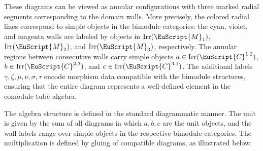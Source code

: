 \documentclass[a4paper,11pt]{article}
\theoremstyle{definition}
\theoremstyle{remark}
\newcommand\eC           {\EuScript{C}}
\newcommand\eM          {\EuScript{M}}
\newcommand{\Irr}{\operatorname{Irr}}
\begin{document}
These diagrams can be viewed as annular configurations with three marked radial segments corresponding to the domain walls. 
More precisely, the colored radial lines correspond to simple objects in the bimodule categories:
the cyan, violet, and magenta walls are labeled by objects in 
$\Irr(\eM_1)$, $\Irr(\eM_2)$, and $\Irr(\eM_3)$, respectively. 
The annular regions between consecutive walls carry simple objects 
$a\in \Irr(\eC^{1,2})$, $b\in \Irr(\eC^{2,3})$, and $c\in \Irr(\eC^{3,1})$.
The additional labels $\gamma,\zeta,\mu,\nu,\sigma,\tau$ 
encode morphism data compatible with the bimodule structures, ensuring that the entire diagram represents a well-defined element in the comodule tube algebra.


The algebra structure is defined in the standard diagrammatic manner.
The unit is given by the sum of all diagrams in which $a,b,c$ are the unit objects, and the wall labels range over simple objects in the respective bimodule categories. 
The multiplication is defined by gluing of compatible diagrams, as illustrated below:
\end{document}
